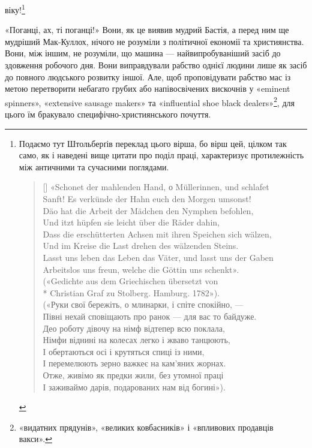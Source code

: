 віку!\footnote{
Подаємо тут Штольберґів переклад цього вірша, бо вірш цей,
цілком так само, як і наведені вище цитати про поділ праці, характеризує
протилежність між античними та сучасними поглядами.

\settowidth{\versewidth}{Lasst uns leben das Leben das Väter, und lasst uns der Gaben}
\begin{verse}[\versewidth]
«Schonet der mahlenden Hand, о Müllerinnen, und schlafet\\
Sanft! Es verkünde der Hahn euch den Morgen umsonst!\\
Däo hat die Arbeit der Mädchen den Nymphen befohlen,\\
Und itzt hüpfen sie leicht über die Räder dahin,\\
Dass die erschütterten Achsen mit ihren Speichen sich wälzen,\\
Und im Kreise die Last drehen des wälzenden Steins.\\
Lasst uns leben das Leben das Väter, und lasst uns der Gaben\\
Arbeitslos uns freun, welche die Göttin uns schenkt».\\
\smallskip
(«Gedichte aus dem Griechischen übersetzt von\\*
Christian Graf zu Stolberg. Hamburg. 1782»).\\
\smallskip
(«Руки свої бережіть, о млинарки, і спіте спокійно, —\\
Півні нехай сповіщають про ранок — для вас то байдуже.\\
Део роботу дівочу на німф відтепер всю поклала,\\
Німфи віднині на колесах легко і жваво танцюють,\\
І обертаються осі і крутяться спиці із ними,\\
І перемелюють зерно важкеє на кам'яних жорнах.\\
Отже, живімо як предки жили, без утомної праці\\
І заживаймо дарів, подарованих нам від богині»).\\
\end{verse}

}

«Поганці, ах, ті поганці!» Вони, як це виявив мудрий Бастія,
а перед ним ще мудріший Мак-Куллох, нічого не розуміли з
політичної економії та християнства. Вони, між іншим, не розуміли,
що машина — найвипробуваніший засіб до здовження робочого
дня. Вони виправдували рабство однієї людини лише як
засіб до повного людського розвитку іншої. Але, щоб проповідувати
рабство мас із метою перетворити небагато грубих або
напівосвічених вискочнів у «eminent spinners», «extensive sausage
makers» та «influential shoe black dealers»\footnote*{
«видатних прядунів», «великих ковбасників» і «впливових
продавців вакси». 
}, для цього їм
бракувало специфічно-християнського почуття.

